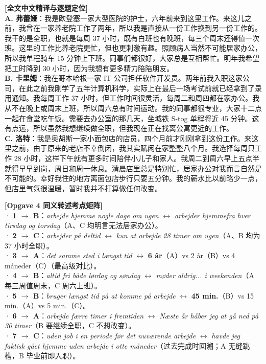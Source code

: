 \begin{transbox}
\small
\textbf{\color{NCDTeal}[全文中文精译与逐题定位]}\\
\textbf{A. 弗蕾娅}：我是欧登塞一家大型医院的护士，六年前来到这里工作。来这儿之前，我曾在一家养老院工作了两年，所以我是直接从一份工作换到另一份工作的。我干的是全职，也就是每周 37 小时，既有白班也有晚班，每三个周末还得值一次班。这里的工作比养老院更忙，但也更刺激有趣。照顾病人当然不可能居家办公，所以我单程骑车 15 分钟上下班。同事们都很好，大家总是互相帮忙。明年我希望把工时降到 30 小时，因为我想有更多精力陪陪朋友。\\
\textbf{B. 卡里姆}：我在哥本哈根一家 IT 公司担任软件开发员。两年前我入职这家公司，在此之前我刚学了五年计算机科学，实际上在最后一场考试前就已经拿到了录用通知。我每周工作 37 小时，但工作时间很灵活，每周二和周四都在家办公。我从不在晚上或周末上班，所以周六总有时间运动。我的同事都很专业，大家十二点一起在食堂吃午饭。需要去办公室的那几天，坐城铁 S-tog 单程将近 45 分钟。这有点远，所以虽然我想继续做全职，但我现在正在找离公寓更近的工作。\\
\textbf{C. 洛特}：我是奥胡斯一家小面包店的店员，四个月前才刚刚拿到这份工作。来这里之前，由于原来的老店不幸倒闭，我其实赋闲在家整整八个月。我选择每周只工作 28 小时，这样下午就有更多时间陪伴小儿子和家人。我周二到周六早上五点半就得早早到岗，周日和周一休息。清晨店里总是特别忙，居家办公对我而言自然是不可能的。幸好我住的地方离面包店步行只要五分钟。我的薪水比以前略少一点，但店里气氛很温暖，暂时我并不打算做任何改变。

\vspace{0.35em}
\textbf{\color{NCDNavy}[Opgave 4 同义转述考点矩阵]}\\
· \textbf{1 $\rightarrow$ B}：\textit{arbejde hjemme nogle dage om ugen} $\leftrightarrow$ \textit{arbejder hjemmefra hver tirsdag og torsdag}（A、C 均明言无法居家办公）。\\
· \textbf{2 $\rightarrow$ C}：\textit{arbejder på deltid} $\leftrightarrow$ \textit{kun at arbejde 28 timer om ugen}（A、B 均为 37 小时全职）。\\
· \textbf{3 $\rightarrow$ A}：\textit{det samme sted i længst tid} $\leftrightarrow$ \textbf{6 år}（A）vs 2 år（B）vs 4 måneder（C）（最高级对比）。\\
· \textbf{4 $\rightarrow$ B}：\textit{altid fri både lørdag og søndag} $\leftrightarrow$ \textit{møder aldrig... i weekenden}（A 每三周值周末，C 周六上班）。\\
· \textbf{5 $\rightarrow$ B}：\textit{bruger længst tid på at komme på arbejde} $\leftrightarrow$ \textbf{45 min.}（B）vs 15 min.（A）vs 5 min.（C）。\\
· \textbf{6 $\rightarrow$ A}：\textit{arbejde færre timer i fremtiden} $\leftrightarrow$ \textit{Næste år håber jeg at gå ned på 30 timer}（B 要继续全职，C 不想改变）。\\
· \textbf{7 $\rightarrow$ C}：\textit{uden job i en periode før det nuværende arbejde} $\leftrightarrow$ \textit{havde jeg faktisk gået hjemme uden arbejde i otte måneder}（过去完成时回溯；A 无缝跳槽，B 毕业前即入职）。
\end{transbox}

